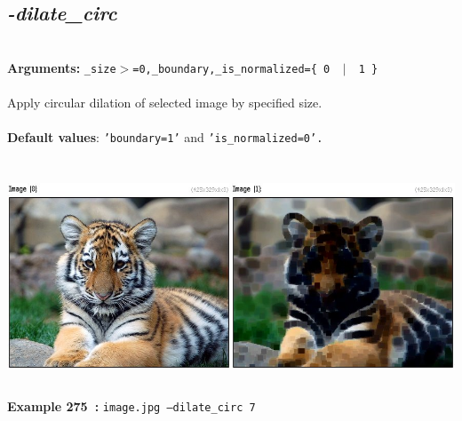 \documentclass[a4paper,11pt,twoside]{book}
\begin{document}
\subsection{\emph{-dilate\_circ} }\vspace*{-0.5em}
~\\\textbf{Arguments: } 
{\small \texttt{\_size$>$=0,\_boundary,\_is\_normalized=\{ 0 ~$|$~ 1 \}}}\\~\\
Apply circular dilation of selected image by specified size.
~\\~\\\textbf{Default values}: {\small \texttt{'boundary=1'} and \texttt{'is\_normalized=0'.}}
\begin{center}\includegraphics[keepaspectratio=true,height=7cm,width=\textwidth]{img/gmic_def275.jpg}\\
{\footnotesize \textbf{Example 275~:} \texttt{image.jpg --dilate\_circ 7}}
\end{center}
\end{document}
